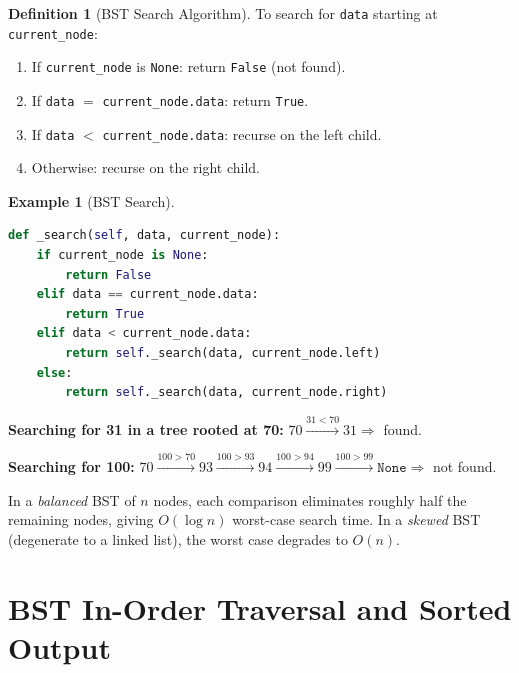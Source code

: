 \documentclass[11pt, a4paper, notitlepage]{report}
\theoremstyle{definition}
\newtheorem{definition}[theorem]{Definition}
\theoremstyle{remark}
\theoremstyle{definition}
\newtheorem{example}[theorem]{Example}
\begin{document}
\begin{definition}[BST Search Algorithm]
\label{def:bst-search}
To search for \texttt{data} starting at \texttt{current\_node}:
\begin{enumerate}
  \item If \texttt{current\_node} is \texttt{None}: return \texttt{False} (not found).
  \item If \texttt{data} $=$ \texttt{current\_node.data}: return \texttt{True}.
  \item If \texttt{data} $<$ \texttt{current\_node.data}: recurse on the left child.
  \item Otherwise: recurse on the right child.
\end{enumerate}
\end{definition}

\begin{example}[BST Search]
\label{ex:bst-search}
\leavevmode
\begin{lstlisting}[language=Python]
def _search(self, data, current_node):
    if current_node is None:
        return False
    elif data == current_node.data:
        return True
    elif data < current_node.data:
        return self._search(data, current_node.left)
    else:
        return self._search(data, current_node.right)
\end{lstlisting}

\textbf{Searching for 31 in a tree rooted at 70:}
$70 \xrightarrow{31 < 70} 31 \Rightarrow$ found.

\textbf{Searching for 100:}
$70 \xrightarrow{100 > 70} 93 \xrightarrow{100 > 93} 94 \xrightarrow{100 > 94}
99 \xrightarrow{100 > 99} \texttt{None} \Rightarrow$ not found.
\end{example}

\begin{keyresult}[title={Key Result: BST Search Complexity}]
In a \emph{balanced} BST of $n$ nodes, each comparison eliminates roughly half the remaining
nodes, giving $O(\log n)$ worst-case search time.  In a \emph{skewed} BST (degenerate to a
linked list), the worst case degrades to $O(n)$.
\end{keyresult}

\section{BST In-Order Traversal and Sorted Output}
\label{sec:bst-inorder-sorted}
\end{document}
